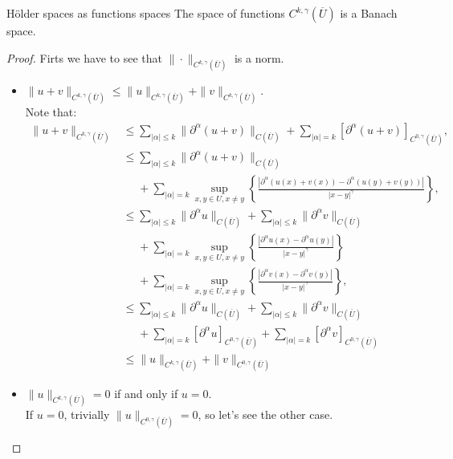 \begin{theorem}{Hölder spaces as functions spaces}
  The space of functions $C^{k,\gamma}(\overline{U})$ is a Banach space. 
\end{theorem}
\begin{proof} 
  Firts we have to see that $\|\cdot\|_{C^{k,\gamma}(\overline{U})}$ is a norm.
  \begin{itemize}
    \item $\|u+v\|_{C^{k,\gamma}(\overline{U})}\leq \|u\|_{C^{k,\gamma}(\overline{U})} + \|v\|_{C^{k,\gamma}(\overline{U})}$.\\
      Note that:
      \begin{align*}
        \|u+v\|_{C^{k,\gamma}(\overline{U})}&\leq \sum_{|\alpha|\leq k}\|\partial^{\alpha}(u+v)\|_{C(\overline{U})}+\sum_{|\alpha|=k}[\partial^{\alpha}(u+v)]_{C^{0,\gamma}(\overline{U})},\\
        &\leq \sum_{|\alpha|\leq k}\|\partial^{\alpha}(u+v)\|_{C(\overline{U})}\\
        &\phantom{\leq}+\sum_{|\alpha|=k} \sup_{x,y\in U, x\neq y}\left\{ \frac{|\partial^{\alpha}(u(x)+v(x))-\partial^{\alpha}(u(y)+v(y))|}{|x-y|^{\gamma}} \right\},\\
        &\leq \sum_{|\alpha|\leq k}\|\partial^{\alpha}u\|_{C(\overline{U})}+\sum_{|\alpha|\leq k}\|\partial^{\alpha}v\|_{C(\overline{U})}\\
        &\phantom{\leq}+\sum_{|\alpha|= k}\sup_{x,y\in U, x\neq y}\left\{ \frac{|\partial^{\alpha}u(x)-\partial^{\alpha}u(y)|}{|x-y|^{\gamma}} \right\}\\
        &\phantom{\leq}+ \sum_{|\alpha|=k}\sup_{x,y\in U, x\neq y}\left\{ \frac{|\partial^{\alpha}v(x)-\partial^{\alpha}v(y)|}{|x-y|^{\gamma}} \right\},\\
        &\leq \sum_{|\alpha|\leq k}\|\partial^{\alpha}u\|_{C(\overline{U})}+\sum_{|\alpha|\leq k}\|\partial^{\alpha}v\|_{C(\overline{U})}\\
        &\phantom{\leq}+\sum_{|\alpha|=k}[\partial^{\alpha}u]_{C^{0,\gamma}(\overline{U})}+ \sum_{|\alpha|=k}[\partial^{\alpha}v]_{C^{0,\gamma}(\overline{U})}\\
        &\leq \|u\|_{C^{k,\gamma}(\overline{U})}+\|v\|_{C^{0,\gamma}(\overline{U})}
      \end{align*}
    \item $\|u\|_{C^{k,\gamma}(\overline{U})}=0$ if and only if $u=0$.\\
      If $u=0$, trivially $\|u\|_{C^{0,\gamma}(\overline{U})}=0$, so let's see the other case.\\

\end{itemize}
\end{proof}
